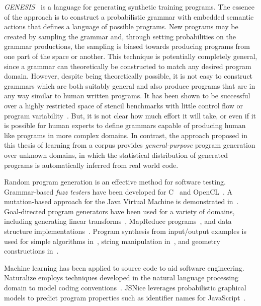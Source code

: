 \emph{GENESIS}~\cite{Chiu2015} is a language for generating synthetic training programs. The essence of the approach is to construct a probabilistic grammar with embedded semantic actions that defines a language of possible programs. New programs may be created by sampling the grammar and, through setting probabilities on the grammar productions, the sampling is biased towards producing programs from one part of the space or another. This technique is potentially completely general, since a grammar can theoretically be constructed to match any desired program domain. However, despite being theoretically possible, it is not easy to construct grammars which are both suitably general and also produce programs that are in any way similar to human written programs. It has been shown to be successful over a highly restricted space of stencil benchmarks with little control flow or program variability~\cite{Garvey2015b,Falch2015,Cummins2015}. But, it is not clear how much effort it will take, or even if it is possible for human experts to define grammars capable of producing human like programs in more complex domains. In contrast, the approach proposed in this thesis of learning from a corpus provides \emph{general-purpose} program generation over unknown domains, in which the statistical distribution of generated programs is automatically inferred from real world code.


Random program generation is an effective method for software testing. Grammar-based \emph{fuzz testers} have been developed for C~\cite{Yang2012} and OpenCL~\cite{Lidbury2015a}. A mutation-based approach for the Java Virtual Machine is demonstrated in~\cite{Chena}. Goal-directed program generators have been used for a variety of domains, including generating linear transforms~\cite{Voronenko2009}, MapReduce programs~\cite{Smith}, and data structure implementations~\cite{Loncaric2016}. Program synthesis from input/output examples is used for simple algorithms in~\cite{Zaremba2015a}, string manipulation in~\cite{Gulwani2011}, and geometry constructions in~\cite{Gulwani2012}.

Machine learning has been applied to source code to aid software engineering. Naturalize employs techniques developed in the natural language processing domain to model coding conventions~\cite{Allamanis2014a}. JSNice leverages probabilistic graphical models to predict program properties such as identifier names for JavaScript~\cite{Raychev}.


